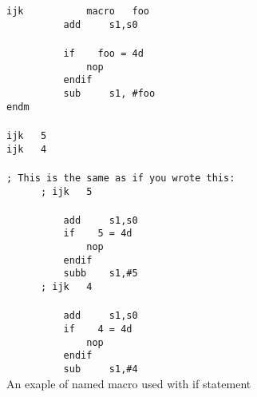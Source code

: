         {
                ~\\
                \usecodefont\\        
            \verb'ijk           macro   foo'\\
            \verb'          add     s1,s0'\\
            \verb''\\
            \verb'          if    foo = 4d'\\
            \verb'              nop'\\
            \verb'          endif'\\
            \verb'          sub     s1, #foo'\\
            \verb'endm'\\\\
            \verb'ijk   5'\\
            \verb'ijk   4'\\\\
            \verb'; This is the same as if you wrote this:'\\
            \verb'      ; ijk   5'\\\\
            \verb'          add     s1,s0'\\
            \verb'          if    5 = 4d'\\
            \verb'              nop'\\
            \verb'          endif'\\
            \verb'          subb    s1,#5'\\
            \verb'      ; ijk   4'\\\\
            \verb'          add     s1,s0'\\
            \verb'          if    4 = 4d'\\
            \verb'              nop'\\
            \verb'          endif'\\
            \verb'          sub     s1,#4'\\
        }
        An exaple of named macro used with if statement


